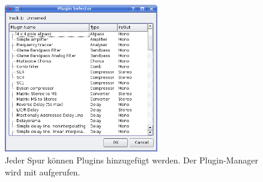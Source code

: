 \begin{figure}[t]
 \centering\includegraphics[width=0.6\textwidth]{../images/plugin-list}
 \caption{Jeder Spur können Plugins hinzugefügt werden. Der Plugin-Manager wird mit  aufgerufen.}
 \label{fig_pluglist}
\end{figure}


